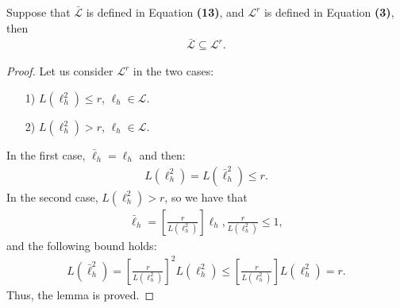 \documentclass[10pt]{llncs}
\begin{document}
\begin{lemma}
\label{lem-lrs-subset-lr}
  Suppose that $\bar{\mathcal{L}}$ is defined in Equation \textbf{(13)},
  and $\mathcal{L}^r$ is defined in Equation \textbf{(3)},
  then
  \begin{align*}
    \bar{\mathcal{L}}\subseteq \mathcal{L}^r.
  \end{align*}
\end{lemma}
\begin{proof}
  Let us consider $\mathcal{L}^r$ in the two cases:
  \begin{itemize}
    \item[1)] $L(\ell_h^2)\leq r$, $\ell_h\in\mathcal{L}$.
    \item[2)] $L(\ell_h^2)>r$, $\ell_h\in\mathcal{L}$.
  \end{itemize}
  In the first case, $\bar{\ell}_h=\ell_h$ and then:
  \begin{align*}
    L(\ell_h^2)=L(\bar{\ell}_h^2)\leq r.
  \end{align*}
  In the second case, $L(\ell_h^2)>r$, so we have that
  \begin{align*}
    \bar{\ell}_h=
    \left[\frac{r}{L(\ell_h^2)}\right]\ell_h, \frac{r}{L(\ell_h^2)}\leq 1,
  \end{align*}
  and the following bound holds:
  \begin{align*}
    L(\bar{\ell}_h^2)= \left[\frac{r}{L(\ell_h^2)}
    \right]^2L(\ell_h^2)\leq \left[\frac{r}{L(\ell_h^2)}
    \right]L(\ell_h^2)= r.
  \end{align*}
  Thus, the lemma is proved.
\end{proof}
\end{document}
